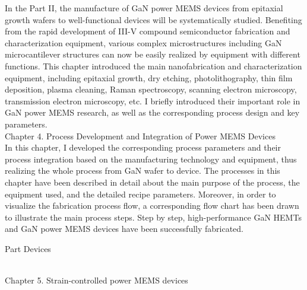 \noindent In the Part II, the manufacture of GaN power MEMS devices from epitaxial growth  wafers  to well-functional devices will be systematically studied. Benefiting from the rapid development of III-V compound semiconductor fabrication and characterization equipment, various complex microstructures including GaN microcantilever  structures can now be easily realized by equipment with different functions. This chapter introduced the main nanofabrication and characterization equipment, including epitaxial  growth, dry  etching, photolithography, thin film  deposition, plasma  cleaning, Raman  spectroscopy, scanning  electron microscopy, transmission  electron microscopy, etc. I briefly introduced their important role in GaN power MEMS  research, as well as the corresponding process  design and key parameters.\\

\noindent Chapter 4. Process Development and Integration of Power MEMS Devices\\

\noindent In this chapter, I developed the corresponding process parameters and their process integration based on the manufacturing technology and equipment, thus realizing the whole process from GaN wafer  to device. The processes in this chapter have been described in detail about the main purpose of the process, the equipment used, and the detailed recipe parameters. Moreover, in order to visualize the fabrication  process flow, a corresponding flow chart has been drawn to illustrate the main process steps. Step by step, high-performance GaN  HEMTs and GaN power  MEMS devices have been successfully fabricated.\\

\begin{large}
\centerline{Part \uppercase\expandafter{} \quad Devices}
\end{large}

~\\

\noindent Chapter 5. Strain-controlled power MEMS devices\\

